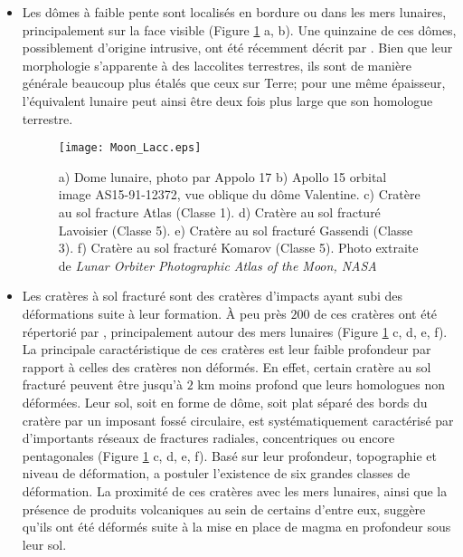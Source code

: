 \begin{itemize}
\item Les dômes  à faible pente sont localisés en  bordure ou dans les
  mers   lunaires,  principalement   sur  la   face  visible   (Figure
  \ref{Moon-magma} a,  b).  Une  quinzaine de ces  dômes, possiblement
  d'origine    intrusive,    ont     été    récemment    décrit    par
  \citet{Wohler:2007it}.  Bien que leur  morphologie s'apparente à des
  laccolites terrestres,  ils sont  de manière générale  beaucoup plus
  étalés que  ceux sur  Terre; pour  une même  épaisseur, l'équivalent
  lunaire  peut ainsi  être deux  fois  plus large  que son  homologue
  terrestre.

  \begin{figure}[htpb]
    \begin{center}
      \graphicspath{ {/Users/thorey/Documents/These/Manuscript/Figure/Chapter1/} }
      \texttt{[image: Moon\_Lacc.eps]}
      \caption{a)  Dome lunaire,  photo  par Appolo  17  b) Apollo  15
        orbital image  AS15-91-12372, vue  oblique du  dôme Valentine.
        c) Cratère au sol fracture Atlas (Classe 1). d) Cratère au sol
        fracturé  Lavoisier (Classe  5).  e)  Cratère au  sol fracturé
        Gassendi  (Classe  3).  f)  Cratère  au  sol fracturé  Komarov
        (Classe   5).   Photo   extraite   de  \textit{Lunar   Orbiter
          Photographic Atlas of the Moon, NASA}}
      \label{Moon-magma}
    \end{center}
  \end{figure}

\item Les  cratères à sol  fracturé sont des cratères  d'impacts ayant
  subi des déformations suite à leur  formation.  À peu près $ 200$ de
  ces   cratères  ont   été  répertorié   par  \citet{Schultz:1976kt},
  principalement autour des mers  lunaires (Figure \ref{Moon-magma} c,
  d, e,  f).  La principale  caractéristique de ces cratères  est leur
  faible profondeur  par rapport à  celles des cratères  non déformés.
  En effet, certain  cratère au sol fracturé peuvent  être jusqu'à $2$
  km moins profond que leurs homologues non déformées.  Leur sol, soit
  en  forme de  dôme, soit  plat séparé  des bords  du cratère  par un
  imposant  fossé  circulaire,  est systématiquement  caractérisé  par
  d'importants réseaux de fractures  radiales, concentriques ou encore
  pentagonales (Figure  \ref{Moon-magma} c, d,  e, f).  Basé  sur leur
  profondeur,     topographie     et    niveau     de     déformation,
  \citet{Schultz:1976kt} a postuler l'existence de six grandes classes
  de  déformation.   La  proximité  de ces  cratères  avec  les  mers
  lunaires, ainsi que  la présence de produits volcaniques  au sein de
  certains d'entre eux,  suggère qu'ils ont été déformés  suite à la
  mise en place de magma en profondeur sous leur sol.
\end{itemize}

